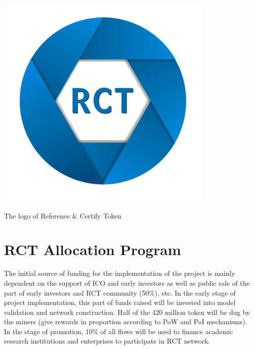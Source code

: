 \documentclass[a4paper,oneside,openany]{tufte-book}
\begin{document}
\begin{marginfigure}
  \includegraphics[width=\textwidth]{fig/logo.png}
  \caption{The logo of Reference \& Certify Token}
\end{marginfigure}





\section{RCT Allocation Program}

The initial source of funding for the implementation of the project is mainly dependent on the support of ICO and early investors as well as public sale of the part of early investors and RCT community (50\%), etc. In the early stage of project implementation, this part of funds raised will be invested into model validation and network construction. Half of the 420 million token will be dug by the miners (give rewards in proportion according to PoW and PoI mechanisms). In the stage of promotion, 10\% of all flows will be used to finance academic research institutions and enterprises to participate in RCT network.
\end{document}
